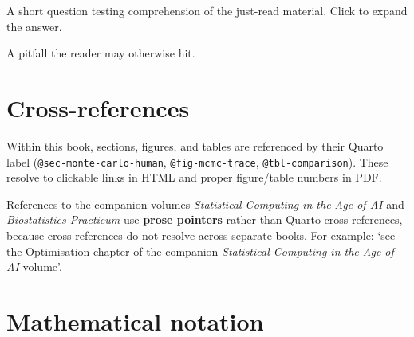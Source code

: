 \documentclass[
  letterpaper,
  11pt]{scrbook}
\begin{document}
\begin{tcolorbox}[enhanced jigsaw, arc=.35mm, bottomrule=.15mm, bottomtitle=1mm, breakable, colback=white, colbacktitle=quarto-callout-note-color!10!white, colframe=quarto-callout-note-color-frame, coltitle=black, left=2mm, leftrule=.75mm, opacityback=0, opacitybacktitle=0.6, rightrule=.15mm, title={Check your understanding: example}, titlerule=0mm, toprule=.15mm, toptitle=1mm]

A short question testing comprehension of the just-read material. Click
to expand the answer.

\end{tcolorbox}

\begin{tcolorbox}[enhanced jigsaw, arc=.35mm, bottomrule=.15mm, bottomtitle=1mm, breakable, colback=white, colbacktitle=quarto-callout-warning-color!10!white, colframe=quarto-callout-warning-color-frame, coltitle=black, left=2mm, leftrule=.75mm, opacityback=0, opacitybacktitle=0.6, rightrule=.15mm, title=\textcolor{quarto-callout-warning-color}{\faExclamationTriangle}\hspace{0.5em}{Warning}, titlerule=0mm, toprule=.15mm, toptitle=1mm]

A pitfall the reader may otherwise hit.

\end{tcolorbox}

\section*{Cross-references}\label{cross-references}


Within this book, sections, figures, and tables are referenced by their
Quarto label (\texttt{@sec-monte-carlo-human}, \texttt{@fig-mcmc-trace},
\texttt{@tbl-comparison}). These resolve to clickable links in HTML and
proper figure/table numbers in PDF.

References to the companion volumes \emph{Statistical Computing in the
Age of AI} and \emph{Biostatistics Practicum} use \textbf{prose
pointers} rather than Quarto cross-references, because cross-references
do not resolve across separate books. For example: `see the Optimisation
chapter of the companion \emph{Statistical Computing in the Age of AI}
volume'.

\section*{Mathematical notation}\label{mathematical-notation}
\end{document}
